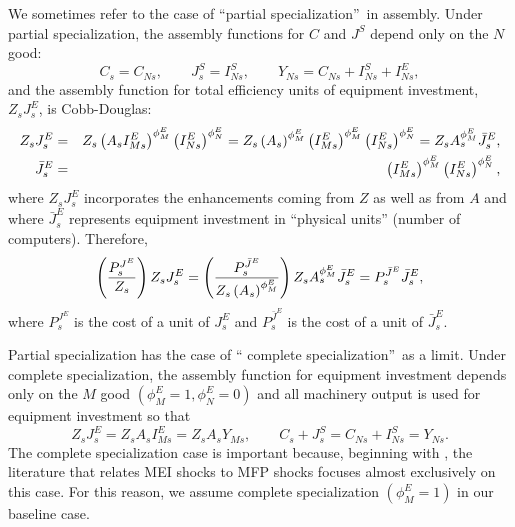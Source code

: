 \documentclass[12pt,fleqn]{article}
\begin{document}
{\normalsize We sometimes refer to the case of \textquotedblleft partial
specialization\textquotedblright\ in assembly. Under partial specialization,
the assembly functions for $C$ and $J^{S}$ depend only on the $N$ good:
\begin{equation}
C_{s}=C_{Ns},\qquad J_{s}^{S}=I_{Ns}^{S},\qquad
Y_{Ns}=C_{Ns}+I_{Ns}^{S}+I_{Ns}^{E},
\end{equation}%
and the assembly function for total efficiency units of equipment
investment, $Z_sJ^{E}_s$, is Cobb-Douglas:
\begin{eqnarray}
Z_sJ_{s}^{E} &=& Z_s\left( A_sI_{Ms}^{E}\right) ^{\phi _{M}^{E}}\left(
I_{Ns}^{E}\right) ^{\phi _{N}^{E}}=Z_s\left( A_s\right) ^{\phi
_{M}^{E}}\left( I_{Ms}^{E}\right) ^{\phi _{M}^{E}}\left( I_{Ns}^{E}\right)
^{\phi _{N}^{E}}= Z_s A_s^{\phi^E_M} \bar{J}^E_s,  \notag
\label{total equipment
efficiency units} \\
\bar{J}^E_s &=& \left( I_{Ms}^{E}\right) ^{\phi _{M}^{E}}\left(
I_{Ns}^{E}\right) ^{\phi _{N}^{E}},  \label{jbar}
\end{eqnarray}
where $Z_sJ_{s}^{E}$ incorporates the enhancements coming from $Z$ as well
as from $A$ and where $\bar{J}^E_s$ represents equipment investment in
``physical units'' (number of computers). Therefore,
\begin{equation}
\left( \frac{P_{s}^{J^{E}}}{Z_s}\right) Z_sJ_{s}^{E}=\left( \frac{P_{s}^{%
\bar{J}^{E}}}{Z_s\left( A_s\right) ^{\phi _{M}^{E}}}\right) Z_s
A_s^{\phi^E_M} \bar{J}^E_s = P_{s}^{\bar{J}^{E}}\bar{J}^E_s,
\label{E value parrtial
specialization}
\end{equation}%
where $P_{s}^{J^{E}}$ is the cost of a unit of $J_{s}^{E}$ and $P_{s}^{\bar{J%
}^{E}}$ is the cost of a unit of $\bar{J}_{s}^{E}.$ }

{\normalsize Partial specialization has the case of \textquotedblleft
complete specialization\textquotedblright\ as a limit. Under complete
specialization, the assembly function for equipment investment depends only
on the $M$ good $\left( \phi _{M}^{E}=1,\phi _{N}^{E}=0\right) $ and all
machinery output is used for equipment investment so that%
\begin{equation}
Z_sJ_{s}^{E}=Z_s A_sI_{Ms}^{E}=Z_sA_sY_{Ms},\qquad
C_{s}+J_{s}^{S}=C_{Ns}+I_{Ns}^{S}=Y_{Ns}.
\end{equation}%
The complete specialization case is important because, beginning with ,
the literature that relates MEI shocks to MFP shocks focuses almost
exclusively on this case. For this reason, we assume complete specialization
$\left( \phi _{M}^{E}=1\right)$ in our baseline case. }
\end{document}
